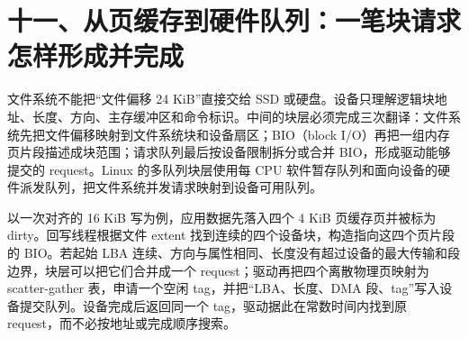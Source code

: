 \section{十一、从页缓存到硬件队列：一笔块请求怎样形成并完成}

文件系统不能把“文件偏移 24 KiB”直接交给 SSD 或硬盘。设备只理解逻辑块地址、长度、方向、主存缓冲区和命令标识。中间的块层必须完成三次翻译：文件系统先把文件偏移映射到文件系统块和设备扇区；BIO（block I/O）再把一组内存页片段描述成块范围；请求队列最后按设备限制拆分或合并 BIO，形成驱动能够提交的 request。Linux 的多队列块层使用每 CPU 软件暂存队列和面向设备的硬件派发队列，把文件系统并发请求映射到设备可用队列。\cite{linux-blk-mq}

以一次对齐的 16 KiB 写为例，应用数据先落入四个 4 KiB 页缓存页并被标为 dirty。回写线程根据文件 extent 找到连续的四个设备块，构造指向这四个页片段的 BIO。若起始 LBA 连续、方向与属性相同、长度没有超过设备的最大传输和段边界，块层可以把它们合并成一个 request；驱动再把四个离散物理页映射为 scatter-gather 表，申请一个空闲 tag，并把“LBA、长度、DMA 段、tag”写入设备提交队列。设备完成后返回同一个 tag，驱动据此在常数时间内找到原 request，而不必按地址或完成顺序搜索。

